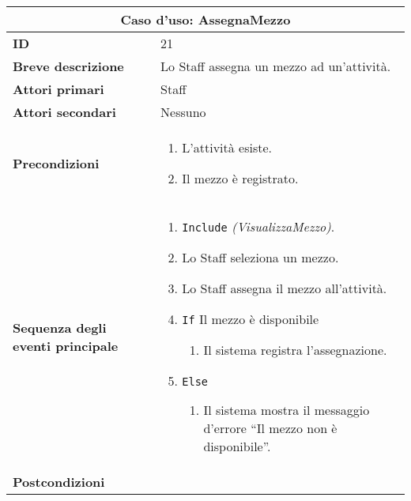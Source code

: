 \documentclass[a4paper]{report}
\begin{document}
\clearpage
\begin{table}[H]
\vspace*{-0cm}
\renewcommand{\arraystretch}{1.9}
\begin{tabular}{|p{3.9cm}|p{9.9cm}|}
\hline
\multicolumn{2}{|c|}{\textbf{Caso d’uso: AssegnaMezzo}} \\ \hline
	\textbf{ID} & 21 \\ \hline
	\textbf{Breve descrizione} & Lo Staff assegna un mezzo ad un’attività. \\ \hline
	\textbf{Attori primari} & Staff \\ \hline
	\textbf{Attori secondari} & Nessuno \\ \hline
	\textbf{Precondizioni} & \begin{enumerate}[leftmargin=14pt,label=\arabic*.,labelsep=0.5em,topsep=0pt,partopsep=0pt,parsep=0pt,itemsep=0pt]
    \item L’attività esiste.
    \item Il mezzo è registrato.
\end{enumerate} \\ \hline
	\textbf{Sequenza degli eventi principale} & \begin{enumerate}[leftmargin=14pt,label=\arabic*.,labelsep=0.5em,topsep=0pt,partopsep=0pt,parsep=0pt,itemsep=0pt]
    \item \texttt{Include} \textit{(VisualizzaMezzo)}.
    \item Lo Staff seleziona un mezzo.
    \item Lo Staff assegna il mezzo all’attività.
    \item \texttt{If} Il mezzo è disponibile
    \begin{enumerate}[label=\arabic{enumi}.\arabic*.,leftmargin=22pt,labelsep=0.5em,topsep=0pt,partopsep=0pt,parsep=0pt,itemsep=0pt]
        \item Il sistema registra l’assegnazione.
    \end{enumerate}
    \item \texttt{Else}
    \begin{enumerate}[label=\arabic{enumi}.\arabic*.,leftmargin=22pt,labelsep=0.5em,topsep=0pt,partopsep=0pt,parsep=0pt,itemsep=0pt]
        \item Il sistema mostra il messaggio d’errore “Il mezzo non è disponibile”.
    \end{enumerate}
\end{enumerate} \\ \hline
	\textbf{Postcondizioni} & \begin{enumerate}[label=\arabic*.,leftmargin=14pt,labelsep=0.5em,topsep=0pt,partopsep=0pt,parsep=0pt,itemsep=0pt]

\end{enumerate}
\end{tabular}
\end{table}
\end{document}
